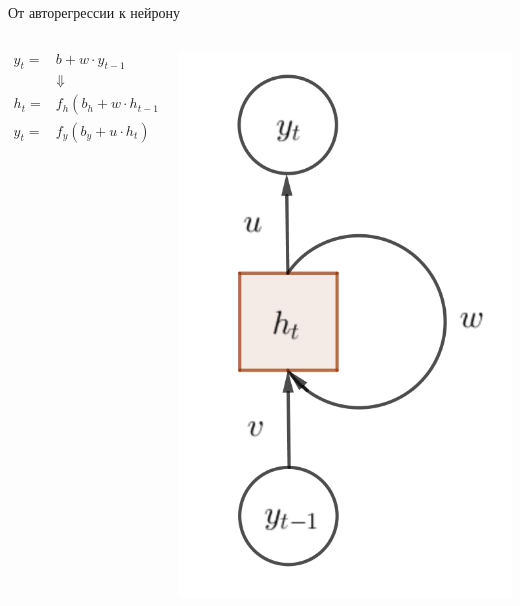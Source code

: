\documentclass[notes,12pt, aspectratio=169]{beamer}
\begin{document}
\begin{frame}{От авторегрессии к нейрону}
\begin{columns}
	\begin{column}{.68\linewidth}
		\begin{equation*} 
		\begin{aligned}
		y_t =& b + w \cdot y_{t-1}\\
		&\Downarrow \\
	   h_t =& f_h(b_h + w \cdot h_{t-1} + v \cdot y_{t-1})\\
	   y_t =& f_y(b_y + u \cdot h_t)
		\end{aligned}
		\end{equation*} 
	\end{column}
	\begin{column}{.28\linewidth}
	\begin{center}
		\includegraphics[width=.9\linewidth]{rec_neuron_2.png}
	\end{center}
\end{column}	
\end{columns}
\end{frame}
\end{document}
